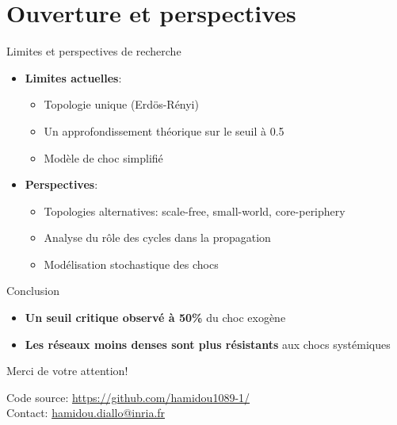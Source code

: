 \documentclass[aspectratio=169]{beamer}
\begin{document}
    \section{Ouverture et perspectives}\label{sec:ouverture-et-perspectives}
    \begin{frame}{Limites et perspectives de recherche}
        \begin{itemize}
            \item \textbf{Limites actuelles}:
            \begin{itemize}
                \item Topologie unique (Erdös-Rényi)
                \item Un approfondissement théorique sur le seuil à 0.5
                \item Modèle de choc simplifié
            \end{itemize}
            \vspace{0.3cm}
            \item \textbf{Perspectives}:
            \begin{itemize}
                \item Topologies alternatives: scale-free, small-world, core-periphery
                \item Analyse du rôle des cycles dans la propagation
                \item Modélisation stochastique des chocs
            \end{itemize}
        \end{itemize}
    \end{frame}

    \begin{frame}{Conclusion}
        \begin{center}
            \begin{itemize}
                \item \textbf{Un seuil critique observé à 50\%} du choc exogène
                \item \textbf{Les réseaux moins denses sont plus résistants} aux chocs systémiques
            \end{itemize}

            \vspace{1cm}
            Merci de votre attention!

            \vspace{0.5cm}
            \small
            Code source: \url{https://github.com/hamidou1089-1/}\\
            Contact: \href{mailto:hamidou.diallo@grenoble-inp.org}{hamidou.diallo@inria.fr}
        \end{center}
    \end{frame}
\end{document}
